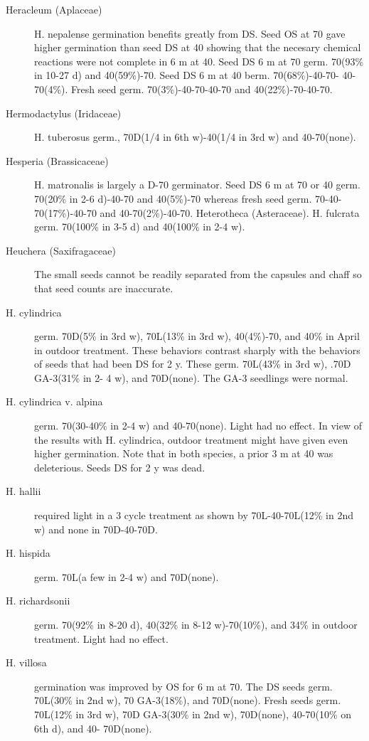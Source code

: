 \begin{description}
\item[Heracleum (Aplaceae)] H. nepalense germination benefits greatly from
DS. Seed OS at 70 gave higher germination than seed DS at 40 showing that the
necesary chemical reactions were not complete in 6 m at 40. Seed DS 6 m at 70
germ. 70(93\% in 10-27 d) and 40(59\%)-70. Seed DS 6 m at 40 berm. 70(68\%)-40-70-
40-70(4\%). Fresh seed germ. 70(3\%)-40-70-40-70 and 40(22\%)-70-40-70.

\item[Hermodactylus (Iridaceae)] H. tuberosus germ., 70D(1/4 in 6th w)-40(1/4 in
3rd w) and 40-70(none).

\item[Hesperia (Brassicaceae)] H. matronalis is largely a D-70 germinator.
Seed DS 6 m at 70 or 40 germ. 70(20\% in 2-6 d)-40-70 and 40(5\%)-70 whereas fresh
seed germ. 70-40-70(17\%)-40-70 and 40-70(2\%)-40-70.
Heterotheca (Asteraceae). H. fulcrata germ. 70(100\% in 3-5 d) and
40(100\% in 2-4 w).

\item[Heuchera (Saxifragaceae)] The small seeds cannot be readily separated
from the capsules and chaff so that seed counts are inaccurate.
\item[H. cylindrica] germ. 70D(5\% in 3rd w), 70L(13\% in 3rd w), 40(4\%)-70, and 40\%
in April in outdoor treatment. These behaviors contrast sharply with the behaviors of
seeds that had been DS for 2 y. These germ. 70L(43\% in 3rd w), .70D GA-3(31\% in 2-
4 w), and 70D(none). The GA-3 seedlings were normal.
\item[H. cylindrica v. alpina] germ. 70(30-40\% in 2-4 w) and 40-70(none). Light had
no effect. In view of the results with H. cylindrica, outdoor treatment might have given
even higher germination. Note that in both species, a prior 3 m at 40 was deleterious.
Seeds DS for 2 y was dead.

\item[H. hallii] required light in a 3 cycle treatment as shown by 70L-40-70L(12\% in
2nd w) and none in 70D-40-70D.
\item[H. hispida] germ. 70L(a few in 2-4 w) and 70D(none).
\item[H. richardsonii] germ. 70(92\% in 8-20 d), 40(32\% in 8-12 w)-70(10\%), and 34\%
in outdoor treatment. Light had no effect.
\item[H. villosa] germination was improved by OS for 6 m at 70. The DS seeds germ.
70L(30\% in 2nd w), 70 GA-3(18\%), and 70D(none). Fresh seeds germ. 70L(12\% in
3rd w), 70D GA-3(30\% in 2nd w), 70D(none), 40-70(10\% on 6th d), and 40-
70D(none).


\end{description}
